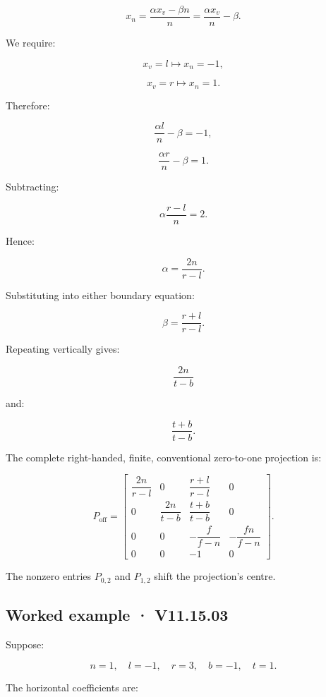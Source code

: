 \[ x_n=\frac{\alpha x_v-\beta n}{n} =\frac{\alpha x_v}{n}-\beta. \]

We require:

\[ x_v=l\longmapsto x_n=-1, \]

\[ x_v=r\longmapsto x_n=1. \]

Therefore:

\[ \frac{\alpha l}{n}-\beta=-1, \]

\[ \frac{\alpha r}{n}-\beta=1. \]

Subtracting:

\[ \alpha\frac{r-l}{n}=2. \]

Hence:

\[ \boxed{\alpha=\frac{2n}{r-l}}. \]

Substituting into either boundary equation:

\[ \boxed{\beta=\frac{r+l}{r-l}}. \]

Repeating vertically gives:

\[ \frac{2n}{t-b} \]

and:

\[ \frac{t+b}{t-b}. \]

The complete right-handed, finite, conventional zero-to-one projection is:

\[ \boxed{ P_{\mathrm{off}}= \begin{bmatrix} \dfrac{2n}{r-l}&0&\dfrac{r+l}{r-l}&0\\ 0&\dfrac{2n}{t-b}&\dfrac{t+b}{t-b}&0\\ 0&0&-\dfrac f{f-n}&-\dfrac{fn}{f-n}\\ 0&0&-1&0 \end{bmatrix}. } \]

The nonzero entries \(P_{0,2}\) and \(P_{1,2}\) shift the projection's centre.

\begin{allmightroleexample}

\subsection{Worked example · V11.15.03}\label{02-foundations-ii-ch035-worked-example-v11.15.03}

\hypertarget{02-foundations-ii-ch035-worked-example-v11.15.03}{}

Suppose:

\end{allmightroleexample}

\[ n=1,\quad l=-1,\quad r=3,\quad b=-1,\quad t=1. \]

The horizontal coefficients are:


